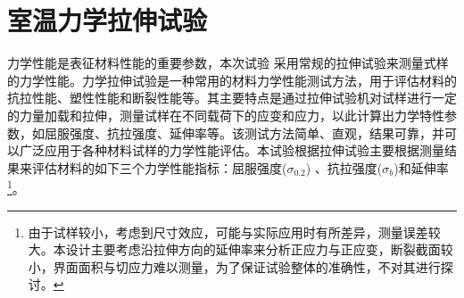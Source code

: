 
\section{室温力学拉伸试验}
力学性能是表征材料性能的重要参数，本次试验%
采用常规的拉伸试验来测量式样的力学性能。力学拉伸试验是一种常用的材料力学性能测试方法，用于评估材料的抗拉性能、塑性性能和断裂性能等。其主要特点是通过拉伸试验机对试样进行一定的力量加载和拉伸，测量试样在不同载荷下的应变和应力，以此计算出力学特性参数，如屈服强度、抗拉强度、延伸率等。该测试方法简单、直观，结果可靠，并可以广泛应用于各种材料试样的力学性能评估。本试验根据拉伸试验主要根据测量结果来评估材料的如下三个力学性能指标：屈服强度($ \sigma_{0.2} $) 、抗拉强度($ \sigma_b $)和延伸率\footnote{由于试样较小，考虑到尺寸效应，可能与实际应用时有所差异，测量误差较大。本设计主要考虑沿拉伸方向的延伸率来分析正应力与正应变，断裂截面较小，界面面积与切应力难以测量，为了保证试验整体的准确性，不对其进行探讨。}。

